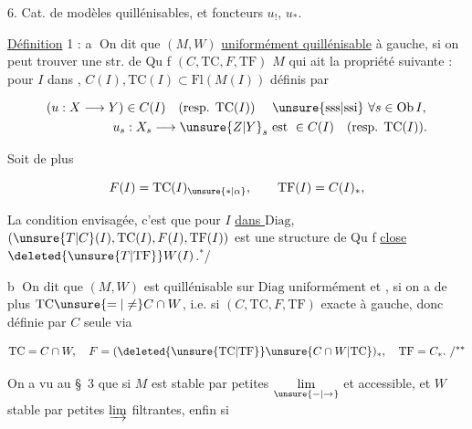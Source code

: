 
6. Cat. de modèles quillénisables, et foncteurs $u_!$, $u_*$.

\uline{Définition} 1 : \textcircled{a} On dit que $(M,W)$  \uline{uniformément quillénisable} à gauche,  si on peut trouver une str. de Qu f $(C,\mathrm{TC},F,\mathrm{TF})$  $M$ qui  ait la propriété suivante : pour $I$ dans  ,   $C(I),\mathrm{TC}(I)\subset\mathrm{Fl}(M(I))$ définis par

\[
\begin{aligned}
(u:X\longrightarrow Y)\in C(I)\quad(\text{resp. }\mathrm{TC}(I))\quad&\text{ \unsure{sss|ssi} }\forall s\in\mathrm{Ob}\,I,\\
u_s:X_s\longrightarrow \unsure{Z|Y}_s&\text{ est }\in C(I)\quad(\text{resp. }\mathrm{TC}(I)).
\end{aligned}
\]

Soit de plus

\[ F(I)=\mathrm{TC}(I)_{\unsure{*|\alpha}},\qquad \mathrm{TF}(I)=C(I)_*, \]

La condition envisagée, c'est que pour  $I$ \uline{dans $\mathrm{Diag}$}, $(\unsure{T|C}(I),\mathrm{TC}(I),F(I),\mathrm{TF}(I))$ est une structure de Qu f \uline{close}   $\deleted{\unsure{T|\mathrm{TF}}}W(I)$.$^{*}$/



\textcircled{b} On dit que $(M,W)$ est quillénisable sur $\mathrm{Diag}$ uniformément et  , si on  a de plus $\mathrm{TC}\unsure{=|\ne}C\cap W$, i.e. si $(C,\mathrm{TC},F,\mathrm{TF})$  exacte à gauche, donc définie par $C$ seule via

\[ \mathrm{TC}=C\cap W,\quad F=(\deleted{\unsure{\mathrm{TC}|\mathrm{TF}}}\unsure{C\cap W|\mathrm{TC}})_*,\quad \mathrm{TF}=C_*.\ /{}^{**} \]



On a vu au \S~3 que si $M$ est  stable par petites $\underset{\unsure{-|\to}}{\lim}$ et accessible, et $W$ stable par petites $\varinjlim$ filtrantes, enfin si
